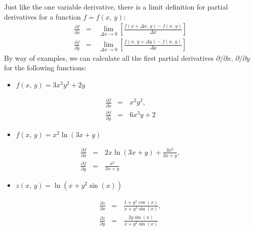 \documentclass[letterpaper,10pt,english]{jupyterBook}
\begin{document}
\sphinxAtStartPar
Just like the one variable derivative, there is a limit definition for partial derivatives for a function \(f = f(x,\,y)\):
\begin{equation*}
\begin{split}\frac{\partial f}{\partial x} &=&\, \lim_{\Delta x \rightarrow 0} \left[\frac{f(x + \Delta x,\, y) - f(x,\, y)}{\Delta x} \right]\\
\frac{\partial f}{\partial y} &=&\, \lim_{\Delta x \rightarrow 0} \left[\frac{f(x,\, y + \Delta y) - f(x,\, y)}{\Delta y} \right]\end{split}
\end{equation*}
\sphinxAtStartPar
By way of examples, we can calculate all the first partial derivatives \(\partial/\partial x,\, \partial/\partial y\) for the following functions:
\begin{itemize}
\item {} 
\sphinxAtStartPar
\(f(x,\,y) = 3x^3 y^2 + 2 y \)

\end{itemize}
\begin{equation*}
\begin{split}\frac{\partial f}{\partial x} &=&\, x^2 y^2, \\
\frac{\partial f}{\partial y} &=&\, 6x^3 y+2\end{split}
\end{equation*}\begin{itemize}
\item {} 
\sphinxAtStartPar
\(f(x,\,y) = x^2 \ln(3x+y)\)

\end{itemize}
\begin{equation*}
\begin{split}\frac{\partial f}{\partial x} &=&\, 2x\ln(3x+y) + \frac{3x^2}{3x+y}, \\
\frac{\partial f}{\partial y} &=&\, \frac{x^2}{3x+y}\end{split}
\end{equation*}\begin{itemize}
\item {} 
\sphinxAtStartPar
\(z(x,\,y) = \ln(x+y^2\sin(x))\)

\end{itemize}
\begin{equation*}
\begin{split}\frac{\partial z}{\partial x} &=&\, \frac{1+y^2\cos(x)}{x+y^2\sin(x)}, \\
\frac{\partial z}{\partial y} &=&\, \frac{2y\sin(x)}{x+y^2\sin(x)}\end{split}
\end{equation*}
\end{document}
